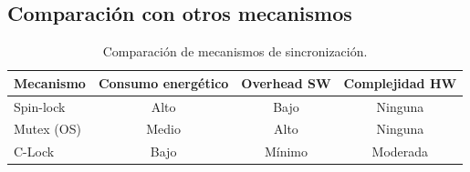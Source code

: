 \subsection{Comparación con otros mecanismos}

\begin{table}[H]
    \centering
    \caption{Comparación de mecanismos de sincronización.}
    \begin{tabular}{lccc}
        \toprule
        Mecanismo       & Consumo energético & Overhead SW & Complejidad HW \\
        \midrule
        Spin-lock       & Alto               & Bajo        & Ninguna        \\
        Mutex (OS)      & Medio              & Alto        & Ninguna        \\
        C-Lock          & Bajo               & Mínimo      & Moderada       \\
        \bottomrule
    \end{tabular}
    \label{tab:comparacion}
\end{table}

